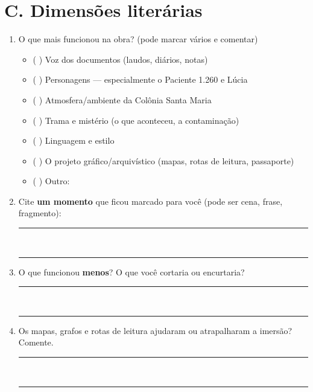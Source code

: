 \documentclass[11pt,a4paper]{article}
\begin{document}
\section*{C. Dimensões literárias}
\begin{enumerate}[label=C\arabic*]
\item O que mais funcionou na obra? (pode marcar vários e comentar)
  \begin{itemize}[label=\textbullet]
  \item ( ) Voz dos documentos (laudos, diários, notas)
  \item ( ) Personagens — especialmente o Paciente 1.260 e Lúcia
  \item ( ) Atmosfera/ambiente da Colônia Santa Maria
  \item ( ) Trama e mistério (o que aconteceu, a contaminação)
  \item ( ) Linguagem e estilo
  \item ( ) O projeto gráfico/arquivístico (mapas, rotas de leitura, passaporte)
  \item ( ) Outro: \dotfill
  \end{itemize}
\item Cite \textbf{um momento} que ficou marcado para você (pode ser cena, frase, fragmento):\\[4pt]
  \rule{\textwidth}{0.3pt}\\[2pt]
  \rule{\textwidth}{0.3pt}
\item O que funcionou \textbf{menos}? O que você cortaria ou encurtaria?\\[4pt]
  \rule{\textwidth}{0.3pt}\\[2pt]
  \rule{\textwidth}{0.3pt}
\item Os mapas, grafos e rotas de leitura ajudaram ou atrapalharam a imersão? Comente.\\[4pt]
  \rule{\textwidth}{0.3pt}\\[2pt]
  \rule{\textwidth}{0.3pt}
\end{enumerate}
\end{document}
